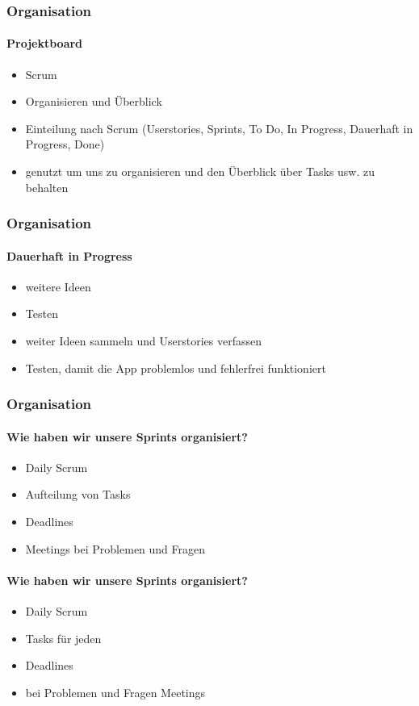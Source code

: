 \documentclass[notes]{beamer}
\begin{document}
	\begin{frame}
		\frametitle{Organisation}
		\framesubtitle{Projektboard}
		\begin{itemize}
			\item Scrum
			\item Organisieren und Überblick
		\end{itemize}
	\end{frame}
	\note
	{
		
		\begin{itemize}
			\item Einteilung nach Scrum (Userstories, Sprints, To Do, In Progress, Dauerhaft in Progress, Done)
			\item genutzt um uns zu organisieren und den Überblick über Tasks usw. zu behalten
		\end{itemize}
	}
	\begin{frame}
		\frametitle{Organisation}
		\framesubtitle{Dauerhaft in Progress}
		\begin{itemize}
			\item weitere Ideen
			\item Testen
		\end{itemize}
	\end{frame}
	\note
	{
		\begin{itemize}
			\item weiter Ideen sammeln und Userstories verfassen
			\item Testen, damit die App problemlos und fehlerfrei funktioniert
		\end{itemize}
	}
	\begin{frame}
		\frametitle{Organisation}
		\framesubtitle{Wie haben wir unsere Sprints organisiert?}
		\begin{itemize}
			\item Daily Scrum
			\item Aufteilung von Tasks
			\item Deadlines
			\item Meetings bei Problemen und Fragen
		\end{itemize}
	\end{frame}
	\note
	{
		
		\framesubtitle{Wie haben wir unsere Sprints organisiert?}
		\begin{itemize}
			\item Daily Scrum
			\item Tasks für jeden
			\item Deadlines
			\item bei Problemen und Fragen Meetings
		\end{itemize}
	}
\end{document}
